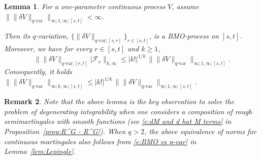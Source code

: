 \documentclass[11pt,reqno]{amsart}
\newtheorem{lemma}{Lemma}[section]
\newtheorem{remark}[lemma]{Remark}
\numberwithin{equation}{section}
\begin{document}
\begin{lemma}\label{lem:BMO of q-var}
For a one-parameter continuous process $V$, assume $\| \|\delta V\|_{q\text{-}\mathrm{var}} \|_{\infty;1,\infty;[s,t]} < \infty$. 

Then its $q$-variation, $\{  \|\delta V\|_{q\text{-}\mathrm{var};[s,r]}\}_{r\in [s,t]}$, is a \emph{BMO}-process on $[s,t]$. Moreover, we have for every $r \in [s,t]$ and $k \ge 1$,
\begin{equation}\label{e:enery esti for q-var}
\big\| \|\delta V\|_{q\text{-}\mathrm{var};[r,t]} \big| \mathcal F_{r} \big\|_{k,\infty} \le |k!|^{1/k} \, \big\| \|\delta V\|_{q\text{-}\mathrm{var}} \big\|_{\infty;1,\infty;[s,t]}. 
\end{equation}
Consequently, it holds $\big\| \|\delta V\|_{q\text{-}\mathrm{var}} \big\|_{\infty;k,\infty;[s,t]} \le |k!|^{1/k} \, \big\| \|\delta V\|_{q\text{-}\mathrm{var}} \big\|_{\infty;1,\infty;[s,t]}$.  
\end{lemma}
 
\begin{remark}\label{rem:use of BMO of q-var}
Note that the above lemma is the key observation to solve the problem of degenerating integrability when one considers a composition of rough semimartingales with smooth functions (see \eqref{e:dM and d hat M terms} in Proposition~\ref{prop:R^G - R^G}).  
When $q > 2$, the above equivalence of norms for continuous martingales also follows from \eqref{e:BMO vs p-var} in Lemma~\ref{lem:Lepingle}. 
\end{remark}
\end{document}
